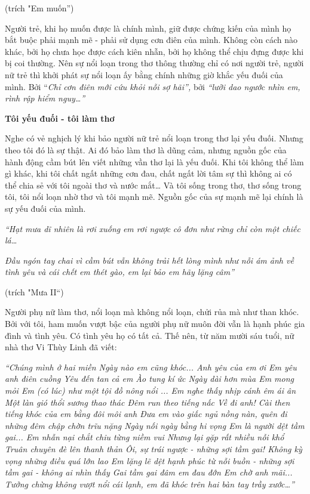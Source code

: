\documentclass[../main.tex]{subfiles}
\begin{document}
\begin{multicols}{2}
\begin{blockquote}
(trích "Em muốn”) 

\end{blockquote}
 
Người trẻ, khi họ muốn được là chính mình, giữ được chứng kiến của mình họ bắt buộc phải mạnh mẽ - phải sử dụng cơn điên của mình. Không còn cách nào khác, bởi họ chưa học được cách kiên nhẫn, bởi họ không thể chịu đựng được khi bị coi thường. Nên sự nổi loạn trong thơ thông thường chỉ có nơi người trẻ, người nữ trẻ thì khởi phát sự nổi loạn ấy bằng chính những giờ khắc yếu đuối của mình. Bởi “\textit{Chỉ cơn điên mới cứu khỏi nỗi sợ hãi”, }bởi \textit{“lưỡi dao ngước nhìn em, rình rập hiểm nguy…”} 
 
 
\textbf{Tôi yếu đuối -  tôi làm thơ} 
 
Nghe có vẻ nghịch lý khi bảo người nữ trẻ nổi loạn trong thơ lại yếu đuối. Nhưng theo tôi đó là sự thật. Ai đó bảo làm thơ là dũng cảm, nhưng nguồn gốc của hành động cầm bút lên viết những vần thơ lại là yếu đuối. Khi tôi không thể làm gì khác, khi tôi chất ngất những cơn đau, chất ngất lời tâm sự thì không ai có thể chia sẻ với tôi ngoài thơ và nước mắt… Và tôi sống trong thơ, thơ sống trong tôi, tôi nổi loạn nhờ thơ và tôi mạnh mẽ. Nguồn gốc của sự mạnh mẽ lại chính là sự yếu đuối của mình.  
\begin{blockquote}
        
\textit{“Hạt mưa dĩ nhiên là rơi xuống}        
\textit{em rơi ngược} 
\textit{cô đơn như rừng chỉ còn một chiếc lá…} 
        
\textit{Đầu ngón tay chai vì cầm bút }        
\textit{vẫn không trải hết lòng mình}        
\textit{như nỗi ám ảnh về tình yêu và cái chết } 
\textit{em thét gào, em lại bảo em hãy lặng câm”} 
        
(trích "Mưa II“) 

\end{blockquote}
 
Người phụ nữ làm thơ, nổi loạn mà không nổi loạn, chửi rủa mà như than khóc. Bởi với tôi, ham muốn vượt bậc của người phụ nữ muôn đời vẫn là hạnh phúc gia đình và tình yêu. Có tình yêu họ có tất cả. Thế nên, từ năm mười sáu tuổi, nữ nhà thơ Vi Thùy Linh đã viết:  
\begin{blockquote}
 
\textit{“Chúng mình ở hai miền 
Ngày nào em cũng khóc... 
Anh yêu của em ơi 
Em yêu anh điên cuồng 
Yêu đến tan cả em 
Ào tung kí ức 
Ngày dài hơn mùa 
Em mong mỏi 
Em (có lúc) như một tội đồ nông nổi 
... Em nghe thấy nhịp cánh êm ái ân 
Một làn gió thổi sương thao thác 
Đêm run theo tiếng nấc 
Về đi anh! 
Cài then tiếng khóc của em bằng đôi môi anh 
Đưa em vào giấc ngủ nồng nàn, quên đi những đêm chập chờn trĩu nặng 
Ngày nối ngày bằng hi vọng 
Em là người dệt tầm gai... 
Em nhẫn nại chắt chiu từng niềm vui  
Nhưng lại gặp rất nhiều nỗi khổ 
Truân chuyên đè lên thanh thản 
Ôi, sự trái ngược - những sợi tầm gai! 
Không kỳ vọng những điều quá lớn lao 
Em lặng lẽ dệt hạnh phúc từ nỗi buồn - những sợi tầm gai - không ai nhìn thấy 
Gai tầm gai đâm em đau đớn 
Em chờ anh mãi... 
Tưởng chừng không vượt nổi cái lạnh, em đã khóc trên hai bàn tay trầy xước…”} 
        

\end{blockquote}
\end{multicols}
\end{document}
